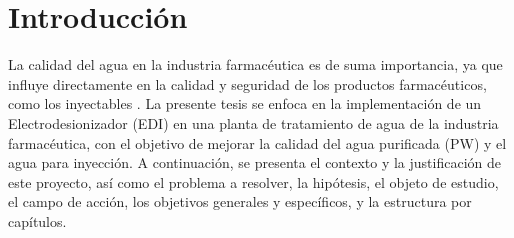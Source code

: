 \chapter*{Introducción}
{}
La calidad del agua en la industria farmacéutica es de suma importancia,
ya que influye directamente en la calidad y seguridad de los productos
farmacéuticos, como los inyectables \cite{juanantoniodelacuerdaImportanciaAguaIndustria2021}. La presente tesis se enfoca en la
implementación de un Electrodesionizador (EDI) en una planta
de tratamiento de agua de la industria farmacéutica, con el objetivo de
mejorar la calidad del agua purificada (PW) y el agua para inyección.
A continuación, se presenta el contexto y la justificación de este
proyecto, así como el problema a resolver, la hipótesis, el objeto
de estudio, el campo de acción, los objetivos generales y específicos,
y la estructura por capítulos.












